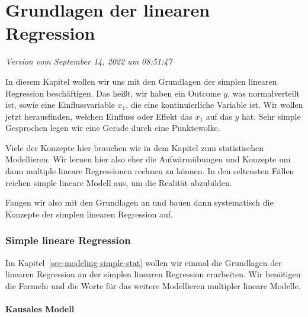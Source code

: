\documentclass[
  letterpaper,
]{scrbook}
\begin{document}
\part{Grundlagen der linearen Regression}

\emph{Version vom September 14, 2022 um 08:51:47}

In diesem Kapitel wollen wir uns mit den Grundlagen der simplen linearen
Regression beschäftigen. Das heißt, wir haben ein Outcome \(y\), was
normalverteilt ist, sowie eine Einflussvariable \(x_1\), die eine
kontinuierliche Variable ist. Wir wollen jetzt herausfinden, welchen
Einfluss oder Effekt das \(x_1\) auf das \(y\) hat. Sehr simple
Gesprochen legen wir eine Gerade durch eine Punktewolke.


Viele der Konzepte hier brauchen wir in dem Kapitel zum statistischen
Modellieren. Wir lernen hier also eher die Aufwärmübungen und Konzepte
um dann multiple lineare Regressionen rechnen zu können. In den
seltensten Fällen reichen simple lineare Modell aus, um die Realität
abzubilden.

Fangen wir also mit den Grundlagen an und bauen dann systematisch die
Konzepte der simplen linearen Regression auf.

\hypertarget{simple-lineare-regression}{%
\section*{Simple lineare Regression}\label{simple-lineare-regression}}

Im Kapitel~\ref{sec-modeling-simple-stat} wollen wir einmal die
Grundlagen der linearen Regression an der simplen linearen Regression
erarbeiten. Wir benötigen die Formeln und die Worte für das weitere
Modellieren multipler lineare Modelle.

\hypertarget{kausales-modell}{%
\subsection*{Kausales Modell}\label{kausales-modell}}
\end{document}
